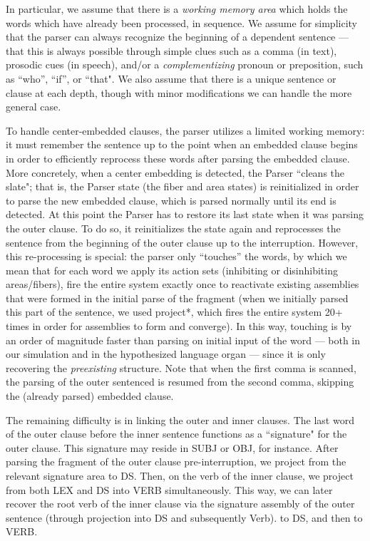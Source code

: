\documentclass[11pt]{article}
\begin{document}
In particular, we assume that there is a {\em working memory area} which holds the words which have already been processed, in sequence. We assume for simplicity that the parser can always recognize the beginning of a dependent sentence --- that this is always possible through simple clues such as a comma (in text), prosodic cues (in speech), and/or a {\em complementizing} pronoun or preposition, such as ``who'', ``if'', or ``that". We also assume that there is a unique sentence or clause at each depth, though with minor modifications we can handle the more general case.


To handle center-embedded clauses, the parser utilizes a limited working memory: it must remember the sentence up to the point when an embedded clause begins in order to efficiently reprocess these words after parsing the embedded clause. More concretely, when a center embedding is detected, the Parser ``cleans the slate"; that is, the Parser state (the fiber and area states) is reinitialized in order to parse the new embedded clause, which is parsed normally until its end is detected. At this point the Parser has to restore its last state when it was parsing the outer clause. To do so, it reinitializes the state again and reprocesses the sentence from the beginning of the outer clause up to the interruption. However, this re-processing is special: the parser only ``touches'' the words, by which we mean that for each word we apply its action sets (inhibiting or disinhibiting areas/fibers), fire the entire system exactly once to reactivate existing assemblies that were formed in the initial parse of the fragment (when we initially parsed this part of the sentence, we used project*, which fires the entire system 20+ times in order for assemblies to form and converge). In this way, touching is by an order of magnitude faster than parsing on initial input of the word --- both in our simulation and in the hypothesized language organ --- since it is only recovering the {\em preexisting} structure.  Note that when the first comma is scanned, the parsing of the outer sentenced is resumed from the second comma, skipping the (already parsed) embedded clause.


The remaining difficulty is in linking the outer and inner clauses. The last word of the outer clause before the inner sentence functions as a ``signature" for the outer clause. This signature may reside in SUBJ or OBJ, for instance. After parsing the fragment of the outer clause pre-interruption, we project from the relevant signature area to {\sc DS}. Then, on the verb of the inner clause, we project from both {\sc LEX} and {\sc DS} into {\sc VERB} simultaneously. This way, we can later recover the root verb of the inner clause via the signature assembly of the outer sentence (through projection into {\sc DS} and subsequently {\sc Verb}). to {\sc DS}, and then to {\sc VERB}.
\end{document}
